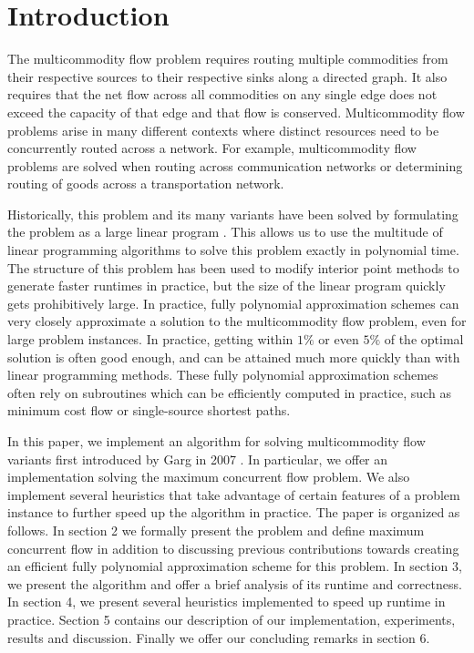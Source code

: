 \section{Introduction}

The multicommodity flow problem requires routing multiple commodities
from their respective sources to their respective sinks along a
directed graph. It also requires that the net flow across all commodities on any
single edge does not exceed the capacity of that edge and that flow is conserved. Multicommodity
flow problems arise in many different contexts where distinct
resources need to be concurrently routed across a network. For example,
multicommodity flow problems are solved when routing across
communication networks or determining routing of goods across a transportation network.

Historically, this problem and its many variants have been solved by
formulating the problem as a large linear program \cite{goldberg}. This allows us to
use the multitude of linear programming
algorithms to solve this problem exactly in polynomial time. The
structure of this problem has been used to modify
interior point methods to generate faster runtimes in practice, but
the size of the linear program quickly gets prohibitively large. In
practice, fully polynomial approximation schemes can very closely
approximate a solution to the multicommodity flow problem, even for
large problem instances. In practice, getting within $1\%$ or even
$5\%$ of the optimal solution is often good enough, and can be
attained much more quickly than with linear
programming methods. These fully polynomial approximation schemes
often rely on subroutines which can be efficiently computed in
practice, such as minimum cost flow or single-source shortest paths.

In this paper, we implement an algorithm for solving multicommodity
flow variants first introduced by Garg in 2007 \cite{garg}. 
In particular, we offer
an implementation solving the maximum concurrent flow problem. We also
implement several heuristics that take advantage of certain features
of a problem instance to further speed up the algorithm in
practice. The paper is organized as follows. In section 2
we formally present the problem and define maximum concurrent flow in
addition to discussing previous contributions towards creating an
efficient fully polynomial approximation scheme for this problem. In
section 3, we present the algorithm and offer a brief analysis of its
runtime and correctness. In section 4, we present several heuristics
implemented to speed up runtime in practice. Section 5 contains our
description of our implementation, experiments, results and
discussion.  Finally we offer our concluding remarks in section 6.

